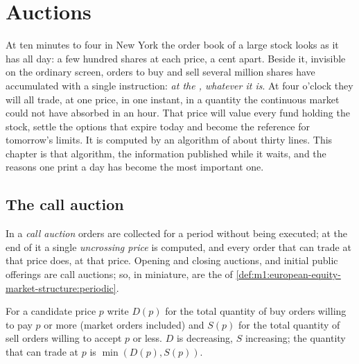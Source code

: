 \chapter{Auctions}\label{ch:m1:auctions}

At ten minutes to four in New York the order book of a large stock looks as
it has all day: a few hundred shares at each price, a cent apart. Beside it,
invisible on the ordinary screen, orders to buy and sell several million
shares have accumulated with a single instruction: \emph{at the , whatever it is}. At four o'clock they will all trade, at one price,
in one instant, in a quantity the continuous market could not have absorbed
in an hour. That price will value every fund holding the stock, settle the
options that expire today and become the reference for tomorrow's limits. It
is computed by an algorithm of about thirty lines. This chapter is that
algorithm, the information published while it waits, and the reasons one
print a day has become the most important one.

\section{The call auction}

\begin{definition}\label{def:m1:auctions:call}
In a \emph{call auction} orders are collected for a period
without being executed; at the end of it a single
\emph{uncrossing price} is computed, and every order
that can trade at that price does, at that price. Opening and closing
auctions,  and initial public offerings are call
auctions; so, in miniature, are the  of
\cref{def:m1:european-equity-market-structure:periodic}.
\end{definition}

For a candidate price $p$ write $D(p)$ for the total quantity of buy orders
willing to pay $p$ or more (market orders included) and $S(p)$ for the total
quantity of sell orders willing to accept $p$ or less. $D$ is decreasing, $S$
increasing; the quantity that can trade at $p$ is $\min(D(p), S(p))$.

